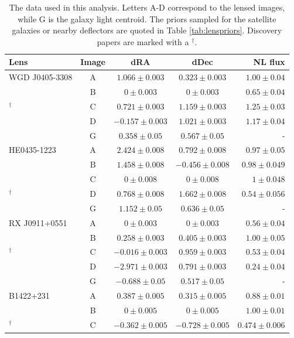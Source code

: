 \begin{table}
	\centering
	\caption{The data used in this analysis. Letters A-D correspond to the lensed images, while G is the galaxy light centroid. The priors sampled for the satellite galaxies or nearby deflectors are quoted in Table \ref{tab:lenspriors}. Discovery papers are marked with a $^{\dagger}$. }
	\label{tab:datasummary}
	\begin{tabular}{lcccr} %
		\hline
		Lens & Image & dRA & dDec & NL flux \\
		\hline
		WGD J0405-3308 & A & $1.066 \pm 0.003$& $0.323 \pm 0.003$ & $1.00 \pm 0.04$\\
		\cite{Nierenberg++19}& B & $0\pm 0.003$& $0 \pm 0.003$ & $0.65 \pm 0.04$\\
		$^{\dagger}$\cite{Anguita++18}& C & $0.721 \pm 0.003$& $1.159 \pm 0.003$ & $1.25 \pm 0.03$\\
		& D & $-0.157 \pm 0.003$& $1.021 \pm 0.003$ & $1.17 \pm 0.04$ \\
		& G & $0.358 \pm 0.05$ & $0.567 \pm 0.05$ & - \\
		\hline
		HE0435-1223 & A & $2.424 \pm 0.008$& $0.792 \pm 0.008$ & $0.97 \pm 0.05$\\
		\cite{Nierenberg++17}& B & $1.458 \pm 0.008$&$-0.456 \pm 0.008$ & $0.98 \pm 0.049$ \\
		\cite{Wong++17}& C & $0 \pm 0.008$ & $0 \pm 0.008$ &$1 \pm 0.048$ \\
		$^{\dagger}$\cite{Witsotzki++02}& D & $0.768 \pm 0.008$& $1.662 \pm 0.008$ & $0.54 \pm 0.056$\\
		& G & $1.152 \pm 0.05 $&$0.636 \pm 0.05$ &- \\
		\hline
		RX J0911+0551 & A & $0 \pm 0.003$& $0 \pm 0.003$ & $0.56 \pm 0.04$\\
		\cite{Nierenberg++19}& B & $0.258 \pm 0.003$& $0.405 \pm 0.003$ & $1.00 \pm 0.05$\\
		$^{\dagger}$\cite{Bade++97}& C & $-0.016 \pm 0.003$& $0.959 \pm 0.003$ & $0.53 \pm 0.04$\\
		\cite{Blackburne++11}& D  & $-2.971 \pm 0.003$& $0.791 \pm 0.003$ & $0.24 \pm 0.04$\\
		& G  & $-0.688 \pm 0.05$& $0.517 \pm 0.05$ & - \\
		\hline
		B1422+231 & A & $0.387 \pm 0.005$ & $0.315 \pm 0.005$& $0.88 \pm 0.01$\\
		\cite{Nierenberg++14} & B & $0 \pm 0.005$& $0 \pm 0.005$& $1.00 \pm 0.01$\\
		$^{\dagger}$\cite{Patnaik++92}& C & $-0.362 \pm 0.005$ & $-0.728 \pm 0.005$ & $0.474 \pm 0.006$ \\

\end{tabular}
\end{table}
